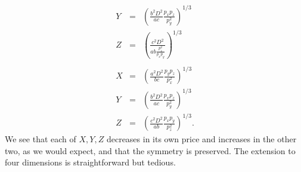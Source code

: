 \documentclass[12pt]{book}
\begin{document}
\begin{eqnarray*}
Y                        &=& \left(\frac{b^2D^2}{ac}\frac{p_xp_z}{p_y^2}\right)^{1/3} \\
Z                        &=& \left(\frac{c^2D^2}{ab\frac{p_z^2}{p_xp_y}}\right)^{1/3} \\
\\
X                        &=& \left(\frac{a^2D^2}{bc}\frac{p_yp_z}{p_x^2}\right)^{1/3}  \\
Y                        &=& \left(\frac{b^2D^2}{ac}\frac{p_xp_z}{p_y^2}\right)^{1/3}  \\
Z                        &=& \left(\frac{c^2D^2}{ab}\frac{p_xp_y}{p_z^2}\right)^{1/3}.
\end{eqnarray*}
We see that each of $X, Y, Z$ decreases in its own price and increases
in the other two, as we would expect, and that the symmetry is preserved.
The extension to four dimensions is straightforward but tedious.
\end{document}
